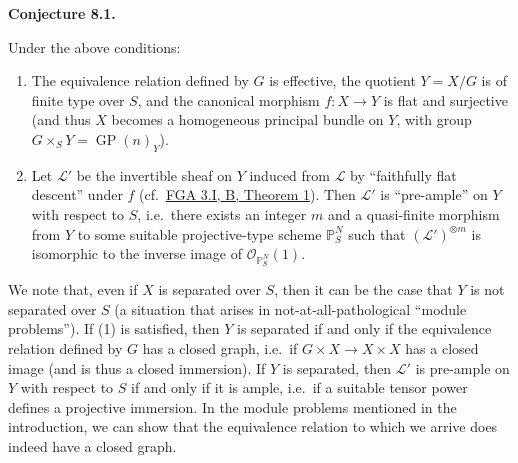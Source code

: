 \documentclass{article}
\newenvironment{itenv}[1]
  {\phantomsection\par\smallskip\noindent\textbf{#1.}\itshape}
  {\par\smallskip}
\theoremstyle{definition}
\theoremstyle{definition}
\theoremstyle{definition}
\theoremstyle{definition}
\theoremstyle{remark}
\begin{document}
\hypertarget{fga-3-iii-conjecture-8.1}{}
\begin{itenv}{Conjecture 8.1}

Under the above conditions:

\begin{enumerate}
\def\labelenumi{\arabic{enumi}.}
\item
  The equivalence relation defined by \(G\) is effective, the quotient \(Y=X/G\) is of finite type over \(S\), and the canonical morphism \(f\colon X\to Y\) is flat and surjective (and thus \(X\) becomes a homogeneous principal bundle on \(Y\), with group \(G\times_S Y=\operatorname{GP}(n)_Y\)).
\item
  Let \({\mathscr{L}}'\) be the invertible sheaf on \(Y\) induced from \({\mathscr{L}}\) by ``faithfully flat descent'' under \(f\) (cf.~\protect\hyperlink{fga-3-i-section-B.1-theorem-1}{FGA 3.I, B, Theorem 1}).
  Then \({\mathscr{L}}'\) is ``pre-ample'' on \(Y\) with respect to \(S\), i.e.~there exists an integer \(m\) and a quasi-finite morphism from \(Y\) to some suitable projective-type scheme \(\mathbb{P}_S^N\) such that \(({\mathscr{L}}')^{\otimes m}\) is isomorphic to the inverse image of \({\mathcal{O}}_{\mathbb{P}_S^N}(1)\).
\end{enumerate}

\end{itenv}

We note that, even if \(X\) is separated over \(S\), then it can be the case that \(Y\) is not separated over \(S\) (a situation that arises in not-at-all-pathological ``module problems'').
If (1) is satisfied, then \(Y\) is separated if and only if the equivalence relation defined by \(G\) has a closed graph, i.e.~if \(G\times X\to X\times X\) has a closed image (and is thus a closed immersion).
If \(Y\) is separated, then \({\mathscr{L}}'\) is pre-ample on \(Y\) with respect to \(S\) if and only if it is ample, i.e.~if a suitable tensor power defines a projective immersion.
In the module problems mentioned in the introduction, we can show that the equivalence relation to which we arrive does indeed have a closed graph.
\end{document}

